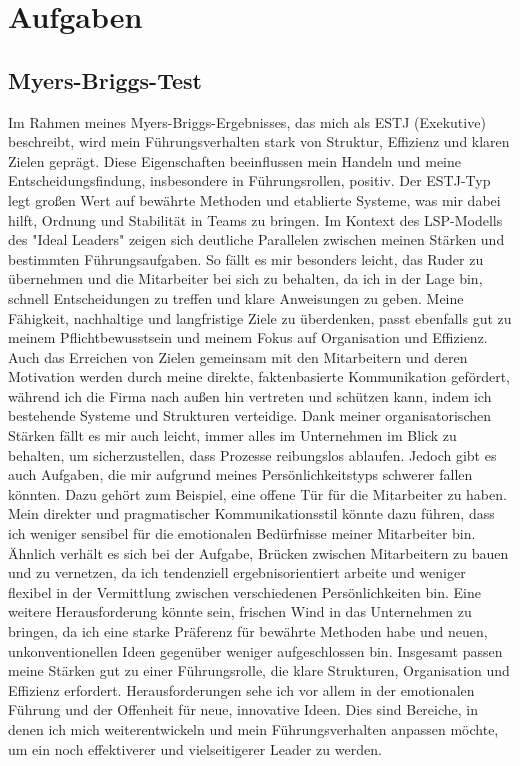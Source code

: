 \section{Aufgaben}
\subsection{Myers-Briggs-Test}

Im Rahmen meines Myers-Briggs-Ergebnisses, das mich als ESTJ (Exekutive) beschreibt, wird mein Führungsverhalten stark von Struktur, Effizienz und klaren Zielen geprägt. Diese Eigenschaften beeinflussen mein Handeln und meine Entscheidungsfindung, insbesondere in Führungsrollen, positiv. Der ESTJ-Typ legt großen Wert auf bewährte Methoden und etablierte Systeme, was mir dabei hilft, Ordnung und Stabilität in Teams zu bringen.
Im Kontext des LSP-Modells des "Ideal Leaders" zeigen sich deutliche Parallelen zwischen meinen Stärken und bestimmten Führungsaufgaben. So fällt es mir besonders leicht, das Ruder zu übernehmen und die Mitarbeiter bei sich zu behalten, da ich in der Lage bin, schnell Entscheidungen zu treffen und klare Anweisungen zu geben. Meine Fähigkeit, nachhaltige und langfristige Ziele zu überdenken, passt ebenfalls gut zu meinem Pflichtbewusstsein und meinem Fokus auf Organisation und Effizienz. Auch das Erreichen von Zielen gemeinsam mit den Mitarbeitern und deren Motivation werden durch meine direkte, faktenbasierte Kommunikation gefördert, während ich die Firma nach außen hin vertreten und schützen kann, indem ich bestehende Systeme und Strukturen verteidige. Dank meiner organisatorischen Stärken fällt es mir auch leicht, immer alles im Unternehmen im Blick zu behalten, um sicherzustellen, dass Prozesse reibungslos ablaufen.
Jedoch gibt es auch Aufgaben, die mir aufgrund meines Persönlichkeitstyps schwerer fallen könnten. Dazu gehört zum Beispiel, eine offene Tür für die Mitarbeiter zu haben. Mein direkter und pragmatischer Kommunikationsstil könnte dazu führen, dass ich weniger sensibel für die emotionalen Bedürfnisse meiner Mitarbeiter bin. Ähnlich verhält es sich bei der Aufgabe, Brücken zwischen Mitarbeitern zu bauen und zu vernetzen, da ich tendenziell ergebnisorientiert arbeite und weniger flexibel in der Vermittlung zwischen verschiedenen Persönlichkeiten bin. Eine weitere Herausforderung könnte sein, frischen Wind in das Unternehmen zu bringen, da ich eine starke Präferenz für bewährte Methoden habe und neuen, unkonventionellen Ideen gegenüber weniger aufgeschlossen bin.
Insgesamt passen meine Stärken gut zu einer Führungsrolle, die klare Strukturen, Organisation und Effizienz erfordert. Herausforderungen sehe ich vor allem in der emotionalen Führung und der Offenheit für neue, innovative Ideen. Dies sind Bereiche, in denen ich mich weiterentwickeln und mein Führungsverhalten anpassen möchte, um ein noch effektiverer und vielseitigerer Leader zu werden.